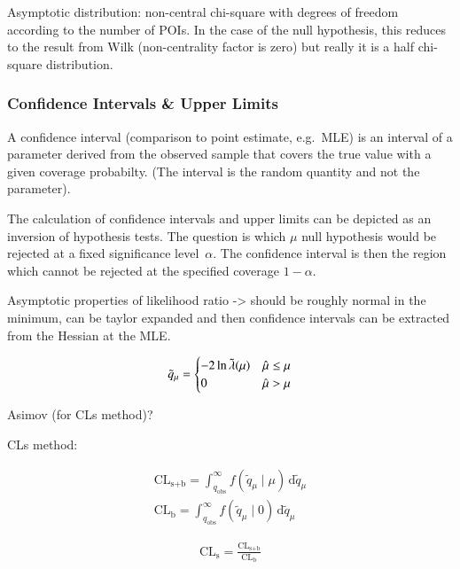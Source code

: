 Asymptotic distribution: non-central chi-square with degrees of
freedom according to the number of POIs. In the case of the null
hypothesis, this reduces to the result from Wilk (non-centrality
factor is zero) but really it is a half chi-square distribution.


\subsubsection{Confidence Intervals \& Upper Limits}

A confidence interval (comparison to point estimate, e.g.\ MLE) is an
interval of a parameter derived from the observed sample that covers
the true value with a given coverage probabilty. (The interval is the
random quantity and not the parameter).

The calculation of confidence intervals and upper limits can be
depicted as an inversion of hypothesis tests. The question is which
$\mu$ null hypothesis would be rejected at a fixed significance
level~$\alpha$. The confidence interval is then the region which
cannot be rejected at the specified coverage $1 - \alpha$.

Asymptotic properties of likelihood ratio -> should be roughly normal
in the minimum, can be taylor expanded and then confidence intervals
can be extracted from the Hessian at the MLE.


\begin{align}
  \tilde{q}_\mu =
  \begin{cases}
    -2 \ln \tilde{\lambda}(\mu) & \hat{\mu} \leq \mu \\
    0 & \hat{\mu} > \mu
  \end{cases}
\end{align}

Asimov (for CLs method)?

CLs method: \cite{Read:2002hq}

\begin{align}
  \text{CL}_\text{s+b} = \int^\infty_{q_\text{obs}} f(\tilde{q}_\mu \mid \mu) \, \mathrm{d}\tilde{q}_\mu \\
  \text{CL}_\text{b} = \int^\infty_{q_\text{obs}} f(\tilde{q}_\mu \mid 0) \, \mathrm{d}\tilde{q}_\mu
\end{align}


\begin{align}
  \text{CL}_\text{s} = \frac{\text{CL}_\text{s+b}}{\text{CL}_\text{b}}
\end{align}





